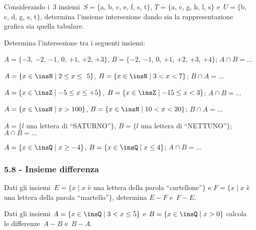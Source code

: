 \begin{esercizio}[\Ast]
 \label{ese:5.58}
Considerando i~3 insiemi~$S=\{$a, b, c, e, f, s, t$\}$, $T=\{$a, c, g, h, l, s$\}$ e~$U=\{$b, c, d, g, s, t$\}$,
determina l'insieme intersezione dando sia la rappresentazione grafica sia quella tabulare.
 \end{esercizio}

\begin{esercizio}
 \label{ese:5.59}
 Determina l'intersezione tra i seguenti insiemi:
\begin{enumeratea}
 \item $A=\{-3$, $-2$, $-1$, $0$, $+1$, $+2$, $+3\}$, $B=\{-2$, $-1$, $0$, $+1$, $+2$, $+3$, $+4\}$; $A\cap B=\ldots$
 \item $A=\{x\in\insN\mid 2\le x\le~5\}$, $B=\{x\in\insN\mid 3<x<7\}$; $B\cap A=\ldots$
 \item $A=\{x\in\insZ\mid -5\le x\le+5\}$, $B=\{x\in\insZ\mid -15\le x<3\}$; $A\cap B=\ldots$
 \item $A=\{x\in\insN\mid x>100\}$, $B=\{x\in\insN\mid 10<x<20\}$; $B\cap A=\ldots$
 \item $A=\{l$ una lettera di ``SATURNO''$\}$, $B=\{l$ una lettera di ``NETTUNO''$\}$; $A\cap B=\ldots$
 \item $A=\{x\in\insQ\mid x\ge -4\}$, $B=\{x\in\insQ\mid x\le 4\}$; $A\cap B=\ldots$
\end{enumeratea}
\end{esercizio}

\subsubsection*{5.8 - Insieme differenza}
\begin{esercizio}[\Ast]
\label{ese:5.60}
Dati gli insiemi~$E=\{x\mid x$ è una lettera della parola ``cartellone''$\}$ e
$F=\{x\mid x$ è una lettera della parola ``martello''$\}$, determina
$E-F$ e~$F-E$.
\end{esercizio}

\begin{esercizio}
\label{ese:5.61}
Dati gli insiemi $A=\{x\in\insQ\mid 3<x\le 5\}$ e $B=\{x\in\insQ\mid x>0\}$ calcola le differenze~$A-B$ e~$B-A$.
\end{esercizio}

